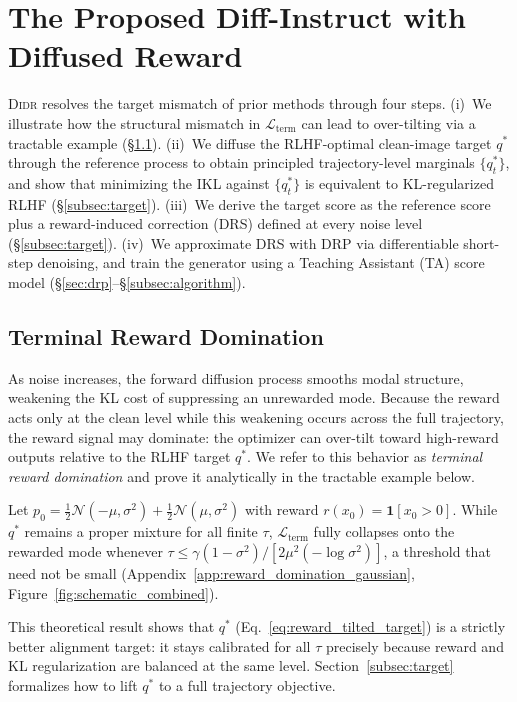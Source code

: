 \section{The Proposed Diff-Instruct with Diffused Reward}
\label{sec:method}

\textsc{Didr} resolves the target mismatch of prior methods through four steps.
(i)~We illustrate how the structural mismatch in $\mathcal{L}_{\mathrm{term}}$ can lead to over-tilting via a tractable example (\S\ref{subsec:trd}).
(ii)~We diffuse the RLHF-optimal clean-image target $q^*$ through the reference process to obtain principled trajectory-level marginals $\{q_t^*\}$, and show that minimizing the IKL against $\{q_t^*\}$ is equivalent to KL-regularized RLHF (\S\ref{subsec:target}).
(iii)~We derive the target score as the reference score plus a reward-induced correction (DRS) defined at every noise level (\S\ref{subsec:target}).
(iv)~We approximate DRS with DRP via differentiable short-step denoising, and train the generator using a Teaching Assistant (TA) score model (\S\ref{sec:drp}--\S\ref{subsec:algorithm}).

\subsection{Terminal Reward Domination}
\label{subsec:trd}
As noise increases, the forward diffusion process smooths modal structure, weakening the KL cost of suppressing an unrewarded mode. Because the reward acts only at the clean level while this weakening occurs across the full trajectory, the reward signal may dominate: the optimizer can over-tilt toward high-reward outputs relative to the RLHF target $q^*$. We refer to this behavior as \emph{terminal reward domination} and prove it analytically in the tractable example below.

\begin{example}
\label{prop:reward_domination}
Let $p_0=\tfrac{1}{2}\mathcal{N}(-\mu,\sigma^2)+\tfrac{1}{2}\mathcal{N}(\mu,\sigma^2)$ with reward $r(x_0)=\mathbf{1}[x_0>0]$. While $q^*$ remains a proper mixture for all finite $\tau$, $\mathcal{L}_{\mathrm{term}}$ fully collapses onto the rewarded mode whenever $\tau\le\gamma(1-\sigma^2)/[2\mu^2(-\log\sigma^2)]$, a threshold that need not be small (Appendix~\ref{app:reward_domination_gaussian}, Figure~\ref{fig:schematic_combined}).
\end{example}
This theoretical result shows that $q^*$ (Eq.~\eqref{eq:reward_tilted_target}) is a strictly better alignment target: it stays calibrated for all $\tau$ precisely because reward and KL regularization are balanced at the same level. Section~\ref{subsec:target} formalizes how to lift $q^*$ to a full trajectory objective.

